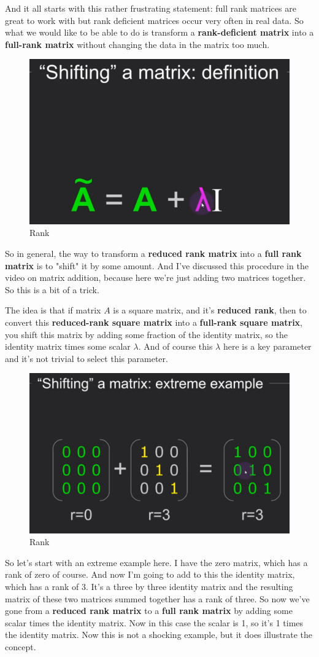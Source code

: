 \documentclass[fleqn,10pt]{olplainarticle}
\theoremstyle{definition}
\theoremstyle{remark}
\begin{document}
And it all starts with this rather frustrating statement: full rank matrices are great to work with but rank deficient matrices occur very often in real data. So what we would like to be able to do is transform a \textbf{rank-deficient matrix} into a \textbf{full-rank matrix} without changing the data in the matrix too much.

\begin{figure}[ht]
	\centering
	\includegraphics[width=0.3\linewidth]{images/rank-29.png}
	\caption{Rank}
	\label{fig:rank_29}
\end{figure}

So in general, the way to transform a \textbf{reduced rank matrix} into a \textbf{full rank matrix} is to "shift" it by some amount. And I've discussed this procedure in the video on matrix addition, because here we're just adding two matrices together. So this is a bit of a trick.

The idea is that if matrix $A$ is a square matrix, and it's \textbf{reduced rank}, then to convert this \textbf{reduced-rank square matrix} into a \textbf{full-rank square matrix}, you shift this matrix by adding some fraction of the identity matrix, so the identity matrix times some scalar $\lambda$. And of course this $\lambda$ here is a key parameter and it's not trivial to select this parameter. 

\begin{figure}[ht]
	\centering
	\includegraphics[width=0.3\linewidth]{images/rank-30.png}
	\caption{Rank}
	\label{fig:rank_30}
\end{figure}

So let's start with an extreme example here. I have the zero matrix, which has a rank of zero of course. And now I'm going to add to this the identity matrix, which has a rank of 3. It's a three by three identity matrix and the resulting matrix of these two matrices summed together has a rank of three. So now we've gone from a \textbf{reduced rank matrix} to a \textbf{full rank matrix} by adding some scalar times the identity matrix. Now in this case the scalar is 1, so it's 1 times the identity matrix. Now this is not a shocking example, but it does illustrate the concept.
\end{document}
